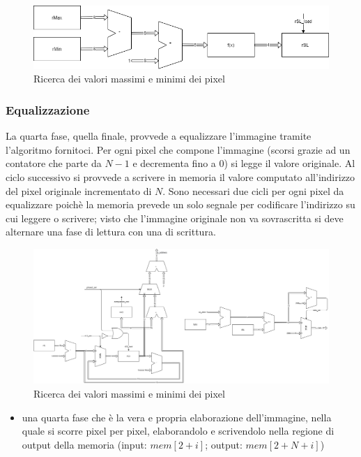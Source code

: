 \documentclass[11pt]{article} %
\begin{document}
\begin{figure}[ht!]
\centering
\includegraphics[width=120mm]{datapaths/regSL_final.png}
\caption{Ricerca dei valori massimi e minimi dei pixel}
\end{figure}


\subsubsection{Equalizzazione}
La quarta fase, quella finale, provvede a equalizzare l'immagine tramite l'algoritmo fornitoci. Per ogni pixel che compone l'immagine (scorsi grazie ad un contatore che parte da $N-1$ e decrementa fino a 0) si legge il valore originale. Al ciclo successivo si provvede a scrivere in memoria il valore computato all'indirizzo del pixel originale incrementato di $N$. Sono necessari due cicli per ogni pixel da equalizzare poichè la memoria prevede un solo segnale per codificare l'indirizzo su cui leggere o scrivere; visto che l'immagine originale non va sovrascritta si deve alternare una fase di lettura con una di scrittura.

\begin{figure}[ht!]
\centering
\includegraphics[width=120mm]{datapaths/computation.png}
\caption{Ricerca dei valori massimi e minimi dei pixel}
\end{figure}

\begin{itemize}
\item una quarta fase che è la vera e propria elaborazione dell'immagine, nella quale si scorre pixel per pixel, elaborandolo e scrivendolo nella regione di output della memoria (input: $mem[2+i]$; output: $mem[2+N+i]$)
\end{itemize}
 
\end{document}

